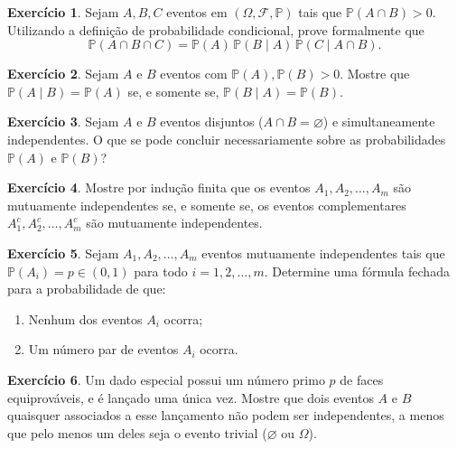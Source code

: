 \documentclass[12pt,portuguese]{article}
\theoremstyle{definition}
\newtheorem{exercise}{Exercício}
\begin{document}
\begin{exercise}\label{exercise:regra-produto}
Sejam \(A, B, C\) eventos em \((\Omega, \mathcal{F}, \mathbb{P})\) tais que \(\mathbb{P}(A \cap B) > 0\). Utilizando a definição de probabilidade condicional, prove formalmente que
\[
  \mathbb{P}(A \cap B \cap C) = \mathbb{P}(A)\,\mathbb{P}(B \mid A)\,\mathbb{P}(C \mid A \cap B).
\]
\end{exercise}

\begin{exercise}\label{exercise:indep-simetrica}
Sejam \(A\) e \(B\) eventos com \(\mathbb{P}(A), \mathbb{P}(B) > 0\). Mostre que \(\mathbb{P}(A \mid B) = \mathbb{P}(A)\) se, e somente se, \(\mathbb{P}(B \mid A) = \mathbb{P}(B)\).
\end{exercise}

\begin{exercise}\label{exercise:disjuntos-indep}
Sejam \(A\) e \(B\) eventos disjuntos (\(A \cap B = \varnothing\)) e simultaneamente independentes. O que se pode concluir necessariamente sobre as probabilidades \(\mathbb{P}(A)\) e \(\mathbb{P}(B)\)?
\end{exercise}

\begin{exercise}\label{exercise:indep-complementares}
Mostre por indução finita que os eventos \(A_1, A_2, \ldots, A_m\) são mutuamente independentes se, e somente se, os eventos complementares \(A_1^c, A_2^c, \ldots, A_m^c\) são mutuamente independentes.
\end{exercise}

\begin{exercise}\label{exercise:p-eventos}
Sejam \(A_1, A_2, \ldots, A_m\) eventos mutuamente independentes tais que \(\mathbb{P}(A_i) = p \in (0,1)\) para todo \(i = 1, 2, \ldots, m\). Determine uma fórmula fechada para a probabilidade de que:
\begin{enumerate}[label=(\alph*)]
  \item Nenhum dos eventos \(A_i\) ocorra;
  \item Um número par de eventos \(A_i\) ocorra.
\end{enumerate}
\end{exercise}

\begin{exercise}\label{exercise:dado-primo}
Um dado especial possui um número primo \(p\) de faces equiprováveis, e é lançado uma única vez. Mostre que dois eventos \(A\) e \(B\) quaisquer associados a esse lançamento não podem ser independentes, a menos que pelo menos um deles seja o evento trivial (\(\varnothing\) ou \(\Omega\)).
\end{exercise}
\end{document}
